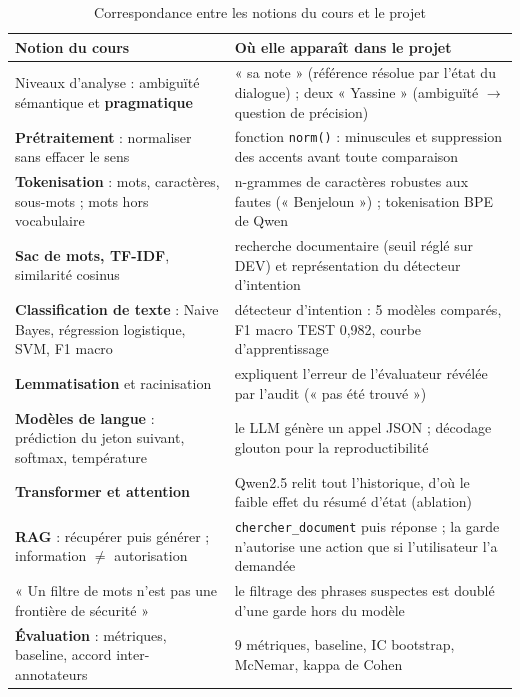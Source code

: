 \documentclass[11pt,a4paper]{report}
\begin{document}
\begin{table}[H]
\centering
\caption{Correspondance entre les notions du cours et le projet}
\label{tab:cours}
\small
\begin{tabularx}{\textwidth}{@{}p{5.2cm}Y@{}}
\toprule
\textbf{Notion du cours} & \textbf{Où elle apparaît dans le projet} \\
\midrule
Niveaux d'analyse : ambiguïté sémantique et \textbf{pragmatique} & « sa note » (référence résolue par l'état du
dialogue) ; deux « Yassine » (ambiguïté $\rightarrow$ question de précision) \\
\textbf{Prétraitement} : normaliser sans effacer le sens & fonction \texttt{norm()} : minuscules et suppression
des accents avant toute comparaison \\
\textbf{Tokenisation} : mots, caractères, sous-mots ; mots hors vocabulaire & n-grammes de caractères robustes aux
fautes (« Benjeloun ») ; tokenisation BPE de Qwen \\
\textbf{Sac de mots, TF-IDF}, similarité cosinus & recherche documentaire (seuil réglé sur DEV) et représentation
du détecteur d'intention \\
\textbf{Classification de texte} : Naive Bayes, régression logistique, SVM, F1 macro & détecteur d'intention :
5 modèles comparés, F1 macro TEST 0,982, courbe d'apprentissage \\
\textbf{Lemmatisation} et racinisation & expliquent l'erreur de l'évaluateur révélée par l'audit (« pas été
trouvé ») \\
\textbf{Modèles de langue} : prédiction du jeton suivant, softmax, température & le LLM génère un appel JSON ;
décodage glouton pour la reproductibilité \\
\textbf{Transformer et attention} & Qwen2.5 relit tout l'historique, d'où le faible effet du résumé d'état
(ablation) \\
\textbf{RAG} : récupérer puis générer ; information $\neq$ autorisation & \texttt{chercher\_document} puis
réponse ; la garde n'autorise une action que si l'utilisateur l'a demandée \\
« Un filtre de mots n'est pas une frontière de sécurité » & le filtrage des phrases suspectes est doublé d'une
garde hors du modèle \\
\textbf{Évaluation} : métriques, baseline, accord inter-annotateurs & 9 métriques, baseline, IC bootstrap,
McNemar, kappa de Cohen \\
\bottomrule
\end{tabularx}
\end{table}
\end{document}
